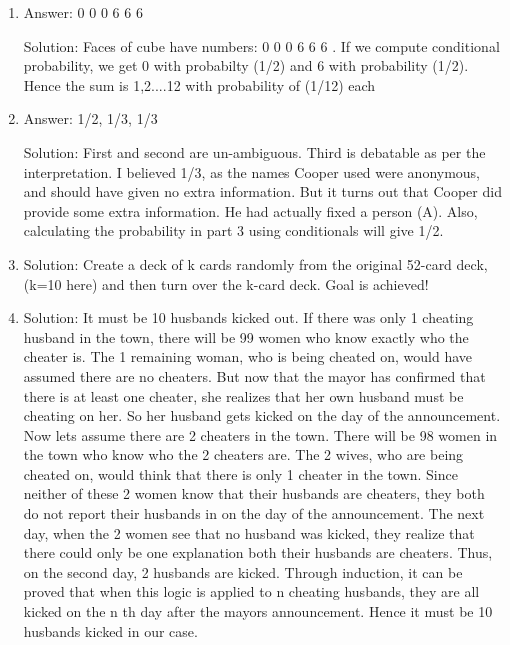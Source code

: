 \begin{enumerate}
\item
Answer: 0 0 0 6 6 6
 
Solution: Faces of cube have numbers: 0 0 0 6 6 6 . If we compute conditional probability, we get 0 with probabilty (1/2) and 6 with probability (1/2). Hence the sum is 1,2....12 with probability of (1/12) each




\item
Answer: 1/2, 1/3, 1/3
 
Solution: First and second are un-ambiguous. Third is debatable as per the interpretation. I believed 1/3, as the names Cooper used were anonymous, and should have given no extra information. But it turns out that Cooper did provide some extra information. He had actually fixed a person (A). Also, calculating the probability in part 3 using conditionals will give 1/2.




\item
Solution: Create a deck of k cards randomly from the original 52-card deck, (k=10 here) and then turn over the k-card deck. Goal is achieved!




\item
Solution: It must be 10 husbands kicked out.
If there was only 1 cheating husband in the town, there will be 99 women who know exactly who the cheater is. The 1 remaining woman, who is being cheated on, would have assumed there are no cheaters. But now that the mayor has confirmed that there is at least one cheater, she realizes that her own husband must be cheating on her. So her husband gets kicked on the day of the announcement.
Now lets assume there are 2 cheaters in the town. There will be 98 women in the town who know who the 2 cheaters are. The 2 wives, who are being cheated on, would think that there is only 1 cheater in the town.  Since neither of these 2 women know that their husbands are cheaters, they both do not report their husbands in on the day of the announcement. The next day, when the 2 women see that no husband was kicked, they realize that there could only be one explanation  both their husbands are cheaters. Thus, on the second day, 2 husbands are kicked.
Through induction, it can be proved that when this logic is applied to n cheating husbands, they are all kicked on the n th day after the mayors announcement. Hence it must be 10 husbands kicked in our case.




\end{enumerate}

